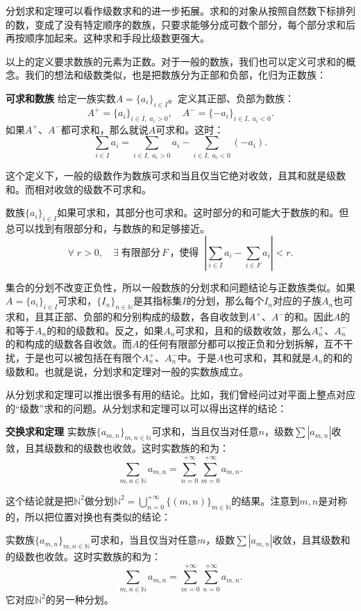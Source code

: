 \documentclass[12pt,UTF8]{ctexbook}
\begin{document}
分划求和定理可以看作级数求和的进一步拓展。求和的对象从按照自然数下标排列的数，变成了没有特定顺序的数族，只要求能够分成可数个部分，每个部分求和后再按顺序加起来。这种求和手段比级数更强大。

以上的定义要求数族的元素为正数。对于一般的数族，我们也可以定义可求和的概念。我们的想法和级数类似，也是把数族分为正部和负部，化归为正数族：
\begin{df}{\textbf{可求和数族}}
    给定一族实数$A = \{a_i\}_{i\in I}$。定义其正部、负部为数族：
    $$ A^+ = \{ a_i \}_{i\in I, \;a_i > 0} , \quad A^- = \{ -a_i \}_{i\in I, \;a_i < 0}. $$
    如果$A^+$、$A^-$都可求和，那么就说$A$可求和。这时：
    $$ \sum_{i\in I} a_i = \sum_{i\in I, \;a_i > 0} a_i - \sum_{i\in I, \;a_i < 0} (-a_i) . $$
\end{df}
这个定义下，一般的级数作为数族可求和当且仅当它绝对收敛，且其和就是级数和。而相对收敛的级数不可求和。

数族$\{a_i\}_{i\in I}$如果可求和，其部分也可求和。这时部分的和可能大于数族的和。但总可以找到有限部分和，与数族的和足够接近。
$$ \forall \; r>0, \quad \exists \;\mbox{有限部分}\,F\,\mbox{，使得}\;\; \left| \sum_{i\in I} a_i - \sum_{i\in F} a_i\right| < r.$$

集合的分划不改变正负性，所以一般数族的分划求和问题结论与正数族类似。如果$A = \{a_i\}_{i\in I}$可求和，$\{I_n\}_{n\in\mathbb{N}}$是其指标集$I$的分划，那么每个$I_n$对应的子族$A_n$也可求和，且其正部、负部的和分别构成的级数，各自收敛到$A^+$、$A^-$的和。因此$A$的和等于$A_n$的和的级数和。反之，如果$A_n$可求和，且和的级数收敛，那么$A_n^+$、$A_n^-$的和构成的级数各自收敛。而$A$的任何有限部分都可以按正负和分划拆解，互不干扰，于是也可以被包括在有限个$A_n^+$、$A_n^-$中。于是$A$也可求和，其和就是$A_n$的和的级数和。也就是说，分划求和定理对一般的实数族成立。

从分划求和定理可以推出很多有用的结论。比如，我们曾经问过对平面上整点对应的“级数”求和的问题。从分划求和定理可以可以得出这样的结论：
\begin{tm}{\textbf{交换求和定理}}
    实数族$\{a_{m,n}\}_{m,n\in\mathbb{N}}$可求和，当且仅当对任意$n$，级数$\sum |a_{m,n}|$收敛，且其级数和的级数也收敛。这时实数族的和为：
    $$ \sum_{m,n\in\mathbb{N}} a_{m,n} = \sum_{n=0}^{+\infty} \sum_{m=0}^{+\infty} a_{m,n}. $$
\end{tm}
这个结论就是把$\mathbb{N}^2$做分划$\mathbb{N}^2 = \bigcup_{n=0}^{+\infty} \{(m,n)\}_{m\in\mathbb{N}}$的结果。注意到$m,n$是对称的，所以把位置对换也有类似的结论：

实数族$\{a_{m,n}\}_{m,n\in\mathbb{N}}$可求和，当且仅当对任意$m$，级数$\sum |a_{m,n}|$收敛，且其级数和的级数也收敛。这时实数族的和为：
$$ \sum_{m,n\in\mathbb{N}} a_{m,n} = \sum_{m=0}^{+\infty} \sum_{n=0}^{+\infty} a_{m,n}. $$
它对应$\mathbb{N}^2$的另一种分划。
\end{document}
